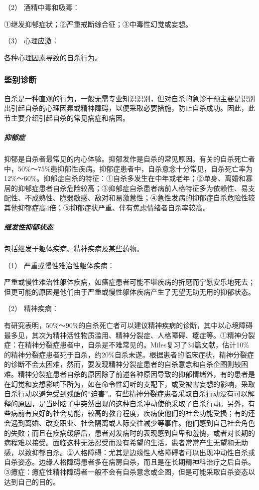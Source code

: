 \hypertarget{text00052.htmlux5cux23CHP1-18-10-1-2-2}{}
（2） 酒精中毒和吸毒：

①继发抑郁症状；②严重戒断综合征；③中毒性幻觉或妄想。

\hypertarget{text00052.htmlux5cux23CHP1-18-10-1-2-3}{}
（3） 心理应激：

各种心理因素导致的自杀行为。

\subsubsection{鉴别诊断}

自杀是一种直观的行为，一般无需专业知识识别，但对自杀的急诊干预主要是识别出引起自杀的心理因素或精神障碍，以便采取必要措施，防止自杀成功。因此，此节主要介绍引起自杀的常见病症和病因。

\subparagraph{抑郁症}

抑郁是自杀者最常见的内心体验。抑郁发作是自杀的常见原因。有关的自杀死亡者中，50\%～75\%患抑郁性疾病。抑郁症患者中，自杀意念十分常见，自杀死亡率为12\%～60\%。抑郁症自杀的特征：①自杀多发生在中年或老年；②单身、离婚和寡居的抑郁症患者自杀危险较高；③抑郁症自杀患者病前人格特征多为依赖性、易支配性、不成熟性、脆弱敏感、敌对和易激惹性；④急性发病的抑郁症自杀危险性较其他抑郁症高4倍；⑤抑郁症状严重、伴有焦虑情绪者自杀率较高。

\subparagraph{继发性抑郁状态}

包括继发于躯体疾病、精神疾病及某些药物。

\hypertarget{text00052.htmlux5cux23CHP1-18-10-2-2-1}{}
（1） 严重或慢性难治性躯体疾病：

严重或慢性难治性躯体疾病，如癌症患者可能不堪疾病的折磨而宁愿安乐地死去；但更可能的原因是他们由于严重或慢性躯体疾病产生了无望无助无用的抑郁状态。

\hypertarget{text00052.htmlux5cux23CHP1-18-10-2-2-2}{}
（2） 精神疾病：

有研究表明，50\%～90\%的自杀死亡者可以建议精神疾病的诊断，其中以心境障碍最多见，其次为精神活性物质滥用、精神分裂症、人格障碍、癔症等。①精神分裂症：在精神分裂症患者中，自杀是不难常见的。Miles复习了34篇文献，估计10\%的精神分裂症患者死于自杀，约20\%自杀未遂。根据患者的临床症状，精神分裂症的诊断不会太困难，然而，要发现精神分裂症患者的自杀意念和自杀企图则较困难。精神分裂症患者自杀的原因除了前述各种原因导致的抑郁情绪外，有的患者是在幻觉和妄想影响下所为，如在命令性幻听的支配下，或受被害妄想的影响，采取自杀行动以避免受到残酷的“迫害”。有些精神分裂症患者采取自杀行动没有可以解释的原因，是当时脑子中突然出现的这种自杀冲动使他采取了自杀行动。另外，有些病前有良好的社会功能，较高的教育程度，疾病使他们的社会功能受损；有的还会遇到离婚、改变职业、社会隔离或人际交往减少等事件。他们感到自己社会角色的失败；而且在疾病缓解后，患者对发病时的表现感到自卑和羞愧，或者对长期的病程难以接受。面临这种无法忍受而没有希望的生活，患者常常产生无望和无助感，以致抑郁自杀。②人格障碍：尤其是边缘性人格障碍者可以出现冲动性自杀或自杀姿态。边缘人格障碍患者多在病房自杀，而且是在长期精神科治疗之后自杀。③癔症：癔症性精神障碍者一般不会有自杀意念或企图，但是可能采取自杀姿态以达到自己的目的。

